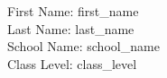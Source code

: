 \documentclass{article}
\begin{document}
First Name: {{ first_name }} \\
Last Name: {{ last_name }} \\
School Name: {{ school_name }} \\
Class Level: {{ class_level }} \\
\end{document}
